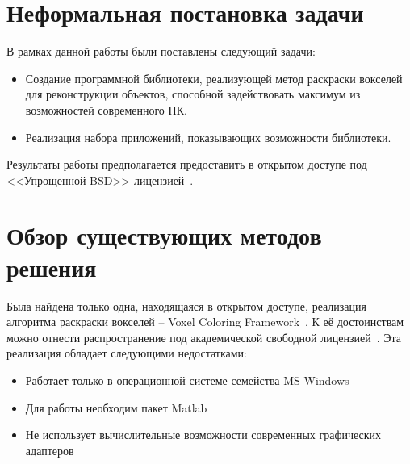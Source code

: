 \section{Неформальная постановка задачи}
В рамках данной работы были поставлены следующий задачи:
\begin{itemize}
\item Создание программной библиотеки, реализующей метод раскраски вокселей для реконструкции объектов, способной задействовать максимум из возможностей современного ПК.
\item Реализация набора приложений, показывающих возможности библиотеки.
\end{itemize}

Результаты работы предполагается предоставить в открытом доступе под <<Упрощенной BSD>> лицензией~\cite{bsd}.

\section{Обзор существующих методов решения}
Была найдена только одна, находящаяся в открытом доступе, реализация алгоритма раскраски вокселей -- Voxel Coloring Framework~\cite{voxel_coloring_framework}. К её достоинствам можно отнести распространение под академической свободной лицензией~\cite{academic_free_license}.
Эта реализация обладает следующими недостатками:
\begin{itemize}
\item Работает только в операционной системе семейства MS Windows
\item Для работы необходим пакет Matlab
\item Не использует вычислительные возможности современных графических адаптеров
\end{itemize}
